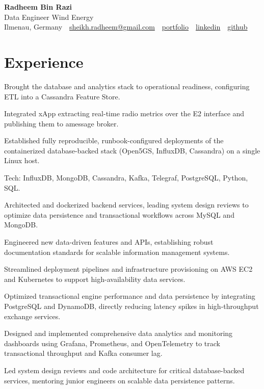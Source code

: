 \documentclass[10pt,a4paper]{resume}
\makeatletter
\newcommand{\Portfolio}{https://radheem.github.io/my-cv}
\newcommand{\PortfolioText}{portfolio}
\newcommand{\GitHub}{https://github.com/radheem}
\newcommand{\LinkedIn}{https://www.linkedin.com/in/radheem-razi}
\newcommand{\Email}{sheikh.radheem@gmail.com}
\makeatother
\begin{document}
\begin{center}
  {\huge\bfseries Radheem Bin Razi}\\[3pt]
  {\large Data Engineer Wind Energy}\\[6pt]
  \small
  Ilmenau, Germany \,\textbar\,
  \href{mailto:\Email}{\Email} \,\textbar\,
  \href{\Portfolio}{\PortfolioText} \,\textbar\,
  \href{\LinkedIn}{linkedin} \,\textbar\,
  \href{\GitHub}{github}
\end{center}
\vspace{2pt}

\section{Experience}

\bullets
  \item Brought the database and analytics stack to operational readiness, configuring ETL into a Cassandra Feature Store.
  \item Integrated xApp extracting real-time radio metrics over the E2 interface and publishing them to amessage broker.
  \item Established fully reproducible, runbook-configured deployments of the containerized database-backed stack (Open5GS, InfluxDB, Cassandra) on a single Linux host.
  \item Tech: InfluxDB, MongoDB, Cassandra, Kafka, Telegraf, PostgreSQL, Python, SQL.
\bulletsend
\vspace{1.5pt}
\bullets
  \item Architected and dockerized backend services, leading system design reviews to optimize data persistence and transactional workflows across MySQL and MongoDB.
  \item Engineered new data-driven features and APIs, establishing robust documentation standards for scalable information management systems.
  \item Streamlined deployment pipelines and infrastructure provisioning on AWS EC2 and Kubernetes to support high-availability data services.
\bulletsend
\vspace{1.5pt}
\bullets
  \item Optimized transactional engine performance and data persistence by integrating PostgreSQL and DynamoDB, directly reducing latency spikes in high-throughput exchange services.
  \item Designed and implemented comprehensive data analytics and monitoring dashboards using Grafana, Prometheus, and OpenTelemetry to track transactional throughput and Kafka consumer lag.
  \item Led system design reviews and code architecture for critical database-backed services, mentoring junior engineers on scalable data persistence patterns.
\bulletsend
\vspace{1.5pt}
\end{document}
